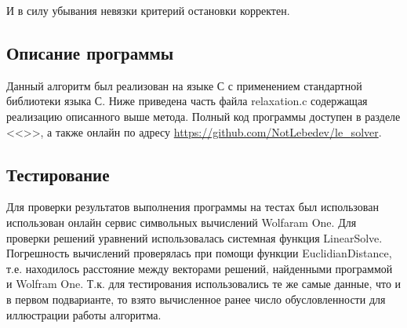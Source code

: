 \documentclass[a4paper,12pt,titlepage,finall]{article}
\begin{document}
И в силу убывания невязки критерий остановки корректен.
\subsection{Описание программы}
Данный алгоритм был реализован на языке С с применением стандартной библиотеки языка С. Ниже приведена часть файла relaxation.c содержащая реализацию описанного выше метода. Полный код программы доступен в разделе <<>>, а также онлайн по адресу \url{https://github.com/NotLebedev/le_solver}.


\subsection{Тестирование}
Для проверки результатов выполнения программы на тестах был использован использован онлайн сервис символьных вычислений Wolfaram One. Для проверки решений уравнений использовалась системная функция {\ttfamily LinearSolve}. Погрешность вычислений проверялась при помощи функции {\ttfamily EuclidianDistance}, т.е. находилось расстояние между векторами решений, найденными программой и Wolfram One. Т.к. для тестирования использовались те же самые данные, что и в первом подварианте, то взято вычисленное ранее число обусловленности для иллюстрации работы алгоритма.
\end{document}
